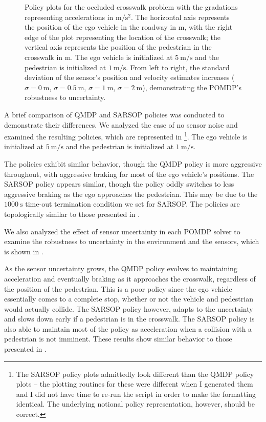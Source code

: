 \documentclass[conference]{IEEEtran}
\begin{document}
\begin{figure}[htbp]
{    }
    \caption{Policy plots for the occluded crosswalk problem with the gradations representing accelerations in $\si{\meter\per\square\second}$. The horizontal axis represents the position of the ego vehicle in the roadway in $\si{\meter}$, with the right edge of the plot representing the location of the crosswalk; the vertical axis represents the position of the pedestrian in the crosswalk in $\si{\meter}$. The ego vehicle is initialized at $5 ~\si{\meter\per\second}$ and the pedestrian is initialized at $1 ~\si{\meter\per\second}$. From left to right, the standard deviation of the sensor's position and velocity estimates increases ($\sigma = 0~ \si{\meter}$, $\sigma = 0.5~ \si{\meter}$, $\sigma = 1~ \si{\meter}$, $\sigma = 2~ \si{\meter}$), demonstrating the POMDP's robustness to uncertainty.}
    \label{fig:qmdp_sarsop_2}
\end{figure}

A brief comparison of QMDP and SARSOP policies was conducted to demonstrate their differences. We analyzed the case of no sensor noise and examined the resulting policies, which are represented in \footnote{The SARSOP policy plots admittedly look different than the QMDP policy plots -- the plotting routines for these were different when I generated them and I did not have time to re-run the script in order to make the formatting identical. The underlying notional policy representation, however, should be correct.}. The ego vehicle is initialized at $5 ~\si{\meter\per\second}$ and the pedestrian is initialized at $1 ~\si{\meter\per\second}$.

The policies exhibit similar behavior, though the QMDP policy is more aggressive throughout, with aggressive braking for most of the ego vehicle's positions. The SARSOP policy appears similar, though the policy oddly switches to less aggressive braking as the ego approaches the pedestrian. This may be due to the $1000 ~\si{\second}$ time-out termination condition we set for SARSOP. The policies are topologically similar to those presented in \cite{Bouton2018ScalableDriving}.

We also analyzed the effect of sensor uncertainty in each POMDP solver to examine the robustness to uncertainty in the environment and the sensors, which is shown in .

As the sensor uncertainty grows, the QMDP policy evolves to maintaining acceleration and eventually braking as it approaches the crosswalk, regardless of the position of the pedestrian. This is a poor policy since the ego vehicle essentially comes to a complete stop, whether or not the vehicle and pedestrian would actually collide. The SARSOP policy however, adapts to the uncertainty and slows down early if a pedestrian is in the crosswalk. The SARSOP policy is also able to maintain most of the policy as acceleration when a collision with a pedestrian is not imminent. These results show similar behavior to those presented in \cite{Bouton2018ScalableDriving}.
\end{document}
